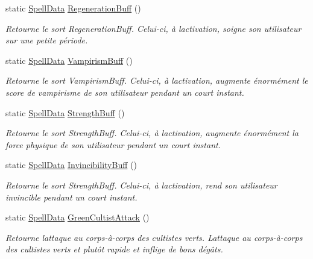 \begin{DoxyCompactItemize}
static \hyperlink{class_tentacle_slicers_1_1spells_1_1_spell_data}{Spell\+Data} \hyperlink{class_tentacle_slicers_1_1customs_1_1_spells_a85c4c7a4dd8b935f2f1f412d4f809c22}{Regeneration\+Buff} ()
\begin{DoxyCompactList}\small\item\em Retourne le sort Regeneration\+Buff. Celui-\/ci, à l\textquotesingle{}activation, soigne son utilisateur sur une petite période. \end{DoxyCompactList}\item 
static \hyperlink{class_tentacle_slicers_1_1spells_1_1_spell_data}{Spell\+Data} \hyperlink{class_tentacle_slicers_1_1customs_1_1_spells_a408ee32a021dc16ef9799804cfda39dc}{Vampirism\+Buff} ()
\begin{DoxyCompactList}\small\item\em Retourne le sort Vampirism\+Buff. Celui-\/ci, à l\textquotesingle{}activation, augmente énormément le score de vampirisme de son utilisateur pendant un court instant. \end{DoxyCompactList}\item 
static \hyperlink{class_tentacle_slicers_1_1spells_1_1_spell_data}{Spell\+Data} \hyperlink{class_tentacle_slicers_1_1customs_1_1_spells_a69a71ba970111827a09e04e8b40b48d5}{Strength\+Buff} ()
\begin{DoxyCompactList}\small\item\em Retourne le sort Strength\+Buff. Celui-\/ci, à l\textquotesingle{}activation, augmente énormément la force physique de son utilisateur pendant un court instant. \end{DoxyCompactList}\item 
static \hyperlink{class_tentacle_slicers_1_1spells_1_1_spell_data}{Spell\+Data} \hyperlink{class_tentacle_slicers_1_1customs_1_1_spells_ac42105a2f08364e32cfd41e3caaff07b}{Invincibility\+Buff} ()
\begin{DoxyCompactList}\small\item\em Retourne le sort Strength\+Buff. Celui-\/ci, à l\textquotesingle{}activation, rend son utilisateur invincible pendant un court instant. \end{DoxyCompactList}\item 
static \hyperlink{class_tentacle_slicers_1_1spells_1_1_spell_data}{Spell\+Data} \hyperlink{class_tentacle_slicers_1_1customs_1_1_spells_a766be599caf989c80cfe9b892d9e9999}{Green\+Cultist\+Attack} ()
\begin{DoxyCompactList}\small\item\em Retourne l\textquotesingle{}attaque au corps-\/à-\/corps des cultistes verts. L\textquotesingle{}attaque au corps-\/à-\/corps des cultistes verts et plutôt rapide et inflige de bons dégâts. \end{DoxyCompactList}\item 

\end{DoxyCompactItemize}
